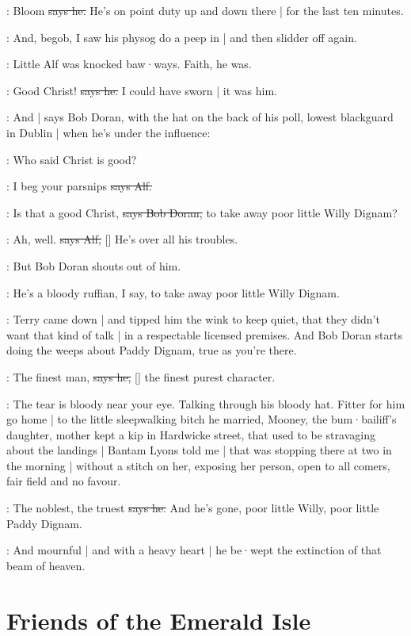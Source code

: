 \citizen:
Bloom
\sout{says he.}
He's on point duty up and down there |
for the last ten minutes.%

\Nq:
And,
begob,
I saw his physog do a peep in |
and then slidder off again.

\Nq:
Little Alf was knocked baw·ways.
Faith,
he was.

\bergan:
Good Christ!
\sout{says he.}
I could have sworn |
it was him.

\Nq:
And |
says Bob Doran,
with the hat on the back of his poll,
lowest blackguard in Dublin |
when he's under the influence:

\doran:
Who said Christ is good?

\bergan:
I beg your parsnips
\sout{says Alf.}

\doran:
Is that a good Christ,
\sout{says Bob Doran,}
to take away poor little Willy Dignam?

\bergan:
Ah,
well.
\sout{says Alf,}
[]
He's over all his troubles.

\Nq:
But Bob Doran shouts out of him.

\doran:
He's a bloody ruffian,
I say,
to take away poor little Willy Dignam.

\Nq:
Terry came down |
and tipped him the wink to keep quiet,
that they didn't want that kind of talk |
in a respectable licensed premises.
And Bob Doran starts doing the weeps about Paddy Dignam,
true as you're there.

\doran:
The finest man,
\sout{says he,}
[]
the finest purest character.

\Nq:
The tear is bloody near your eye.
Talking through his bloody hat.
Fitter for him go home |
to the little sleepwalking bitch he married,
Mooney,
the bum·bailiff's daughter,
mother kept a kip in Hardwicke street,
that used to be stravaging about the landings
 |
Bantam Lyons told me |
that was stopping there at two in the morning |
without a stitch on her,
exposing her person,
open to all comers,
fair field and no favour.

\doran:
The noblest,
the truest
\sout{says he.}
And he's gone,
poor little Willy,
poor little Paddy Dignam.

:
And mournful |
and with a heavy heart |
he be·wept the extinction of that beam of heaven.


\section{Friends of the Emerald Isle}

